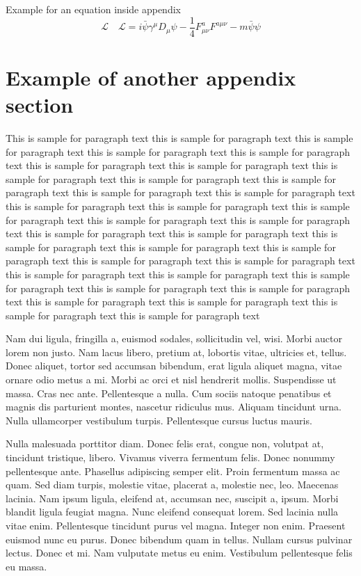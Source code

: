 \documentclass[APA,STIX1COL]{WileyNJD-v2}
\begin{document}
Example for an equation inside appendix
\begin{equation}
\mathcal{L}\quad \mathbf{\mathcal{L}} = i \bar{\psi} \gamma^\mu D_\mu \psi - \frac{1}{4} F_{\mu\nu}^a F^{a\mu\nu} - m \bar{\psi} \psi\label{eq25}
\end{equation}

\section{Example of another appendix section\label{app3}}%

This is sample for paragraph text this is sample for paragraph text  this is sample for paragraph text this is sample for paragraph text this is sample for paragraph text this is sample for paragraph text this is sample for paragraph text this is sample for paragraph text this is sample for paragraph text this is sample for paragraph text this is sample for paragraph text this is sample for paragraph text this is sample for paragraph text this is sample for paragraph text this is sample for paragraph text this is sample for paragraph text this is sample for paragraph text this is sample for paragraph text this is sample for paragraph text this is sample for paragraph text this is sample for paragraph text this is sample for paragraph text this is sample for paragraph text this is sample for paragraph text this is sample for paragraph text this is sample for paragraph text this is sample for paragraph text this is sample for paragraph text this is sample for paragraph text this is sample for paragraph text this is sample for paragraph text this is sample for paragraph text this is sample for paragraph text



Nam dui ligula, fringilla a, euismod sodales, sollicitudin vel, wisi. Morbi auctor lorem non justo. Nam lacus libero,
pretium at, lobortis vitae, ultricies et, tellus. Donec aliquet, tortor sed accumsan bibendum, erat ligula aliquet magna,
vitae ornare odio metus a mi. Morbi ac orci et nisl hendrerit mollis. Suspendisse ut massa. Cras nec ante. Pellentesque
a nulla. Cum sociis natoque penatibus et magnis dis parturient montes, nascetur ridiculus mus. Aliquam tincidunt
urna. Nulla ullamcorper vestibulum turpis. Pellentesque cursus luctus mauris.

Nulla malesuada porttitor diam. Donec felis erat, congue non, volutpat at, tincidunt tristique, libero. Vivamus
viverra fermentum felis. Donec nonummy pellentesque ante. Phasellus adipiscing semper elit. Proin fermentum massa
ac quam. Sed diam turpis, molestie vitae, placerat a, molestie nec, leo. Maecenas lacinia. Nam ipsum ligula, eleifend
at, accumsan nec, suscipit a, ipsum. Morbi blandit ligula feugiat magna. Nunc eleifend consequat lorem. Sed lacinia
nulla vitae enim. Pellentesque tincidunt purus vel magna. Integer non enim. Praesent euismod nunc eu purus. Donec
bibendum quam in tellus. Nullam cursus pulvinar lectus. Donec et mi. Nam vulputate metus eu enim. Vestibulum
pellentesque felis eu massa.
\end{document}
